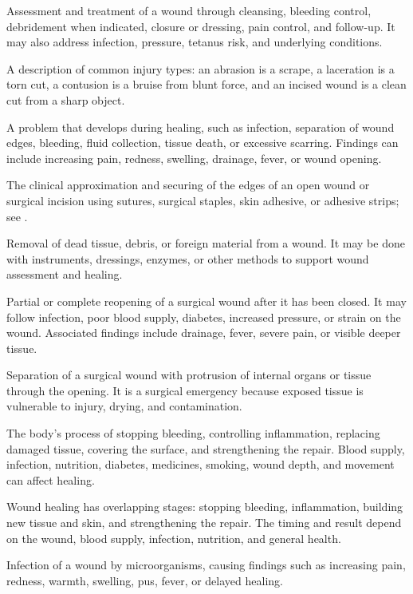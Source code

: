  Assessment and treatment of a wound through cleansing, bleeding control, debridement when indicated, closure or dressing, pain control, and follow-up. It may also address infection, pressure, tetanus risk, and underlying conditions.

 A description of common injury types: an abrasion is a scrape, a laceration is a torn cut, a contusion is a bruise from blunt force, and an incised wound is a clean cut from a sharp object.

 A problem that develops during healing, such as infection, separation of wound edges, bleeding, fluid
collection, tissue death, or excessive scarring. Findings can include increasing pain, redness,
swelling, drainage, fever, or wound opening.

 The clinical approximation and securing of the edges of an open wound or surgical incision using sutures, surgical staples, skin adhesive, or adhesive strips; see .

 Removal of dead tissue, debris, or foreign material from a wound. It may be done with instruments, dressings, enzymes, or other methods to support wound assessment and healing.

 Partial or complete reopening of a surgical wound after it has been closed. It may follow infection, poor blood supply, diabetes, increased pressure, or strain on the wound. Associated findings include drainage, fever, severe pain, or visible deeper tissue.

 Separation of a surgical wound with protrusion of internal organs or tissue through the opening. It is a surgical emergency because exposed tissue is vulnerable to injury, drying, and contamination.

 The body’s process of stopping bleeding, controlling inflammation, replacing damaged tissue, covering the surface, and strengthening the repair. Blood supply, infection, nutrition, diabetes, medicines, smoking, wound depth, and movement can affect healing.

 Wound healing has overlapping stages: stopping bleeding, inflammation, building new tissue and skin, and strengthening the repair. The timing and result depend on the wound, blood supply, infection, nutrition, and general health.

 Infection of a wound by microorganisms, causing findings such as increasing pain, redness, warmth,
swelling, pus, fever, or delayed healing.

